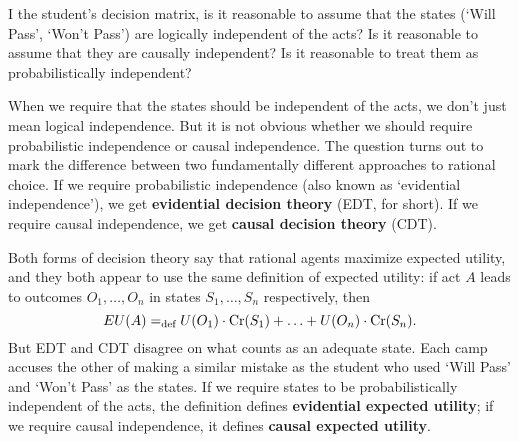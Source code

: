\begin{exercise1}
  I the student's decision matrix, is it reasonable to assume that the
  states (`Will Pass', `Won't Pass') are logically independent of the
  acts? Is it reasonable to assume that they are causally independent?
  Is it reasonable to treat them as probabilistically independent?
\end{exercise1}

When we require that the states should be independent of the acts, we
don't just mean logical independence. But it is not obvious whether we
should require probabilistic independence or causal independence.
The question turns out to mark the difference between two fundamentally
different approaches to rational choice. If we require probabilistic
independence (also known as `evidential independence'), we get
\textbf{evidential decision theory} (EDT, for short). If we require causal
independence, we get \textbf{causal decision theory} (CDT).

Both forms of decision theory say that rational agents maximize
expected utility, and they both appear to use the same definition of
expected utility: if act $A$ leads to outcomes $O_1,\ldots,O_n$
in states $S_1,\ldots,S_n$ respectively, then
\[
EU(A) =_\text{def} U(O_1) \cdot \text{Cr}(S_1) + \ldots + U(O_n) \cdot \text{Cr}(S_n).
\]
But EDT and CDT disagree on what counts as an adequate state. Each
camp accuses the other of making a similar mistake as the student who
used `Will Pass' and `Won't Pass' as the states. If we require states
to be probabilistically independent of the acts, the definition
defines \textbf{evidential expected utility}; if we require causal
independence, it defines \textbf{causal expected utility}.


